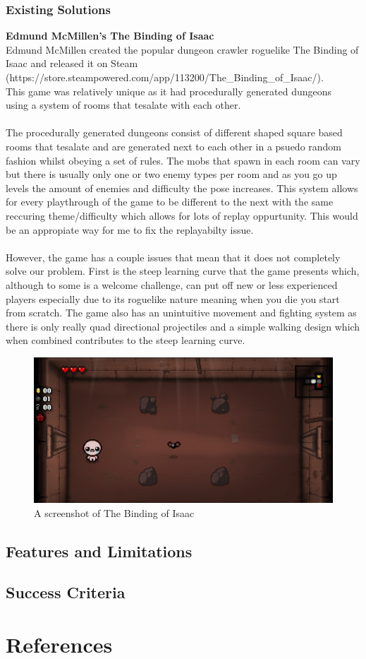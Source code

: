 \documentclass{article}
\begin{document}
        \subsubsection{Existing Solutions}
        \textbf{Edmund McMillen's The Binding of Isaac}\\
        Edmund McMillen created the popular dungeon crawler roguelike The Binding of Isaac and released it on Steam (https://store.steampowered.com/app/113200/The\_Binding\_of\_Isaac/).\\
        This game was relatively unique as it had procedurally generated dungeons \\using a system of rooms that tesalate with each other.\\
        \\
        The procedurally generated dungeons consist of different shaped square based rooms that tesalate and are generated next to each other in a psuedo random fashion whilst obeying a set of rules. The mobs that spawn in each room can vary but there is usually only one or two enemy types per room and as you go up levels the amount of enemies and difficulty the pose increases. This system allows for every playthrough of the game to be different to the next with the same reccuring theme/difficulty which allows for lots of replay oppurtunity. This would be an appropiate way for me to fix the replayabilty issue.\\
        \\
        However, the game has a couple issues that mean that it does not completely solve our problem. First is the steep learning curve that the game presents which, although to some is a welcome challenge, can put off new or less experienced players especially due to its roguelike nature meaning when you die you start from scratch. The game also has an unintuitive movement and fighting system as there is only really quad directional projectiles and a simple walking design which when combined contributes to the steep learning curve.\\
        \begin{figure}[h]
                \centering
                \includegraphics[scale=0.25]{images/research/BOI_Capture.PNG}
                \caption{A screenshot of The Binding of Isaac}
                \label{fig:ie_0}
        \end{figure}
\subsection{Features and Limitations}
\subsection{Success Criteria}
\newpage
\pagestyle{plain}
\section{References}
\end{document}
